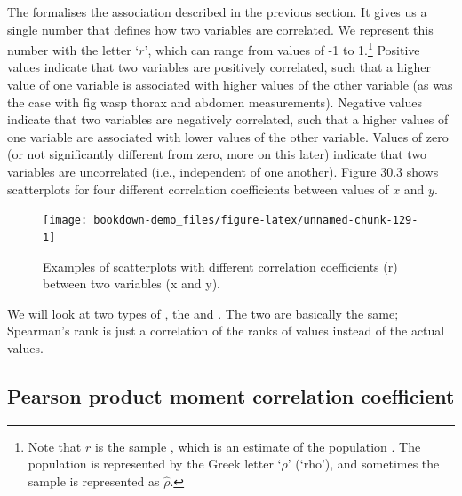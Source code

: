 \documentclass[
  openany]{krantz}
\begin{document}
The \textbf{} formalises the association described in the previous section.
It gives us a single number that defines how two variables are correlated.
We represent this number with the letter `\(r\)', which can range from values of -1 to 1.\footnote{Note that \(r\) is the sample , which is an estimate of the population . The population  is represented by the Greek letter `\(\rho\)' (`rho'), and sometimes the sample  is represented as \(\hat{\rho}\).}
Positive values indicate that two variables are positively correlated, such that a higher value of one variable is associated with higher values of the other variable (as was the case with fig wasp thorax and abdomen measurements).
Negative values indicate that two variables are negatively correlated, such that a higher values of one variable are associated with lower values of the other variable.
Values of zero (or not significantly different from zero, more on this later) indicate that two variables are uncorrelated (i.e., independent of one another).
Figure 30.3 shows scatterplots for four different correlation coefficients between values of \(x\) and \(y\).

\begin{figure}
\texttt{[image: bookdown-demo\_files/figure-latex/unnamed-chunk-129-1]} \caption{Examples of scatterplots with different correlation coefficients (r) between two variables (x and y).}\label{fig:unnamed-chunk-129}
\end{figure}

We will look at two types of , the   and .
The two are basically the same; Spearman's rank  is just a correlation of the ranks of values instead of the actual values.

\hypertarget{pearson-product-moment-correlation-coefficient}{%
\subsection{Pearson product moment correlation coefficient}\label{pearson-product-moment-correlation-coefficient}}
\end{document}
